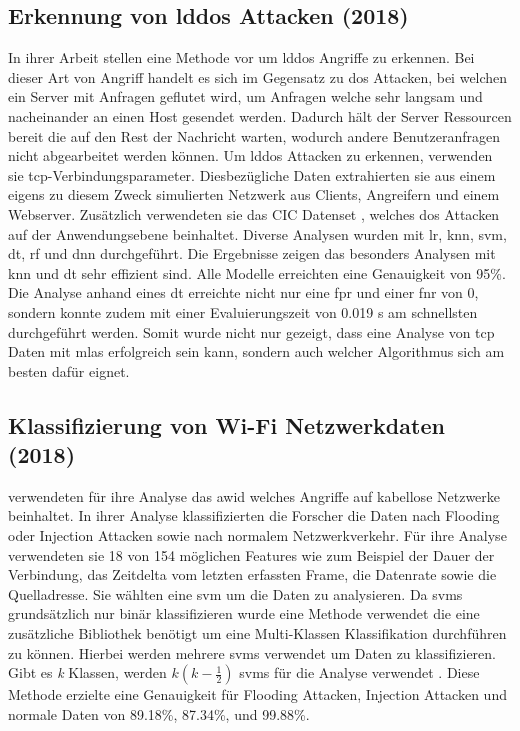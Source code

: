 \documentclass[
    12pt, %
    DIV10,
    ngerman, %
    a4paper, %
    oneside, %
    titlepage, %
    parskip=half, %
    headings=normal, %
    listof=totoc, %
    bibliography=totoc, %
    index=totoc, %
    captions=tableheading, %
    final %
]{scrreprt}
\begin{document}
\subsection{Erkennung von \acs{lddos} Attacken (2018)}\label{cic}
In ihrer Arbeit stellen \textcite{siracusano2018detection} eine Methode vor um \ac{lddos} Angriffe zu erkennen. Bei dieser Art von Angriff handelt es sich im Gegensatz zu \ac{dos} Attacken, bei welchen ein Server mit Anfragen geflutet wird, um Anfragen welche sehr langsam und nacheinander an einen Host gesendet werden. Dadurch hält der Server Ressourcen bereit die auf den Rest der Nachricht warten, wodurch andere Benutzeranfragen nicht abgearbeitet werden können. Um \ac{lddos} Attacken zu erkennen, verwenden sie \ac{tcp}-Verbindungsparameter. Diesbezügliche Daten extrahierten sie aus einem eigens zu diesem Zweck simulierten Netzwerk aus Clients, Angreifern und einem Webserver. Zusätzlich verwendeten sie das CIC Datenset \parencite{jazi2017detecting}, welches \ac{dos} Attacken auf der Anwendungsebene beinhaltet.
Diverse Analysen wurden mit \ac{lr}, \ac{knn}, \ac{svm}, \ac{dt}, \ac{rf} und \ac{dnn} durchgeführt. Die Ergebnisse zeigen das besonders Analysen mit \ac{knn} und \ac{dt} sehr effizient sind. Alle Modelle erreichten eine Genauigkeit von 95\%. Die Analyse anhand eines \acl{dt} erreichte nicht nur eine \ac{fpr} und einer \ac{fnr} von 0, sondern konnte zudem mit einer Evaluierungszeit von 0.019 s am schnellsten durchgeführt werden. Somit wurde nicht nur gezeigt, dass eine Analyse von \ac{tcp} Daten mit \ac{mlas} erfolgreich sein kann, sondern auch welcher Algorithmus sich am besten dafür eignet.
%
\subsection{Klassifizierung von Wi-Fi Netzwerkdaten (2018)}
\textcite{Qin2018} verwendeten für ihre Analyse das \ac{awid} welches Angriffe auf kabellose Netzwerke beinhaltet. In ihrer Analyse klassifizierten die Forscher die Daten nach Flooding oder Injection Attacken sowie nach normalem Netzwerkverkehr. Für ihre Analyse verwendeten sie 18 von 154 möglichen Features wie zum Beispiel der Dauer der Verbindung, das Zeitdelta vom letzten erfassten Frame, die Datenrate sowie die Quelladresse. Sie wählten eine \ac{svm} um die Daten zu analysieren. Da \ac{svms} grundsätzlich nur binär klassifizieren wurde eine Methode verwendet die eine  zusätzliche Bibliothek benötigt um eine Multi-Klassen Klassifikation durchführen zu können. Hierbei werden mehrere \ac{svms} verwendet um Daten zu klassifizieren. Gibt es \emph{k} Klassen, werden \(k(k-\frac{1}{2})\) \ac{svms} für die Analyse verwendet \parencite{Qin2018}. Diese Methode erzielte eine Genauigkeit für Flooding Attacken, Injection Attacken und normale Daten von 89.18\%, 87.34\%, und
99.88\%.
%
%
\end{document}
